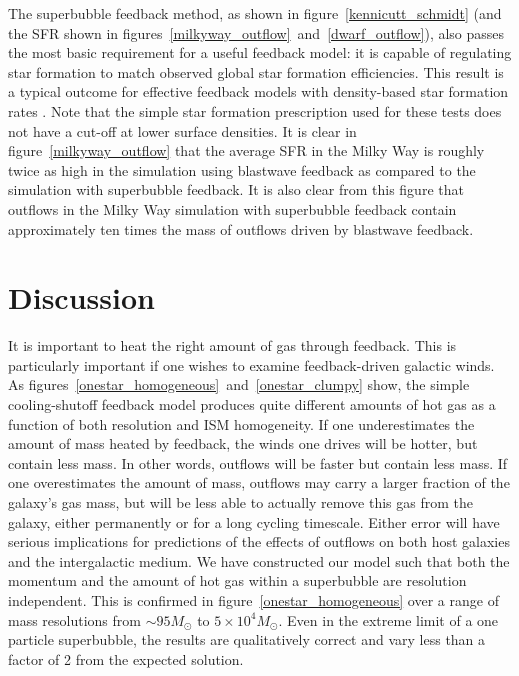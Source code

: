 The superbubble feedback method, as shown in figure~\ref{kennicutt_schmidt} (and
the SFR shown in figures~\ref{milkyway_outflow}~and~\ref{dwarf_outflow}), also
passes the most basic requirement for a useful feedback model:  it is capable of
regulating star formation to match observed global star formation efficiencies.
This result is a typical outcome for effective feedback models with density-based 
star formation rates \citep[e.g.][]{Springel2003}.
Note that the simple star formation prescription used for
these tests does not have a cut-off at lower surface densities.  It is clear in
figure~\ref{milkyway_outflow} that the average SFR in the Milky Way is roughly
twice as high in the simulation using blastwave feedback as compared to the
simulation with superbubble feedback.  It is also clear from this figure that
outflows in the Milky Way simulation with superbubble feedback contain
approximately ten times the mass of outflows driven by blastwave feedback.

\section{Discussion}

It is important to heat the right amount of gas through feedback. This is
particularly important if one wishes to examine feedback-driven galactic winds.
As figures~\ref{onestar_homogeneous}~and~\ref{onestar_clumpy} show, the simple
cooling-shutoff feedback model produces quite different amounts of hot gas as a
function of both resolution and ISM homogeneity.  If one underestimates the
amount of mass heated by feedback, the winds one drives will be hotter, but
contain less mass.  In other words, outflows will be faster but contain less
mass.  If one overestimates the amount of mass, outflows may carry a larger
fraction of the galaxy's gas mass, but will be less able to actually remove
this gas from the galaxy, either permanently or for a long cycling timescale.
Either error will have  serious implications for predictions of the effects of
outflows on both host galaxies and the intergalactic medium.  We have
constructed our model such that both the momentum and the amount of hot gas
within a superbubble are resolution independent.  This is confirmed in
figure~\ref{onestar_homogeneous} over a range of mass 
resolutions from $\sim95M_\odot$ to $5\times10^4M_\odot$.  
Even in the extreme limit of a one particle superbubble,
the results are qualitatively correct and vary less than a factor of 2
from the expected solution.

